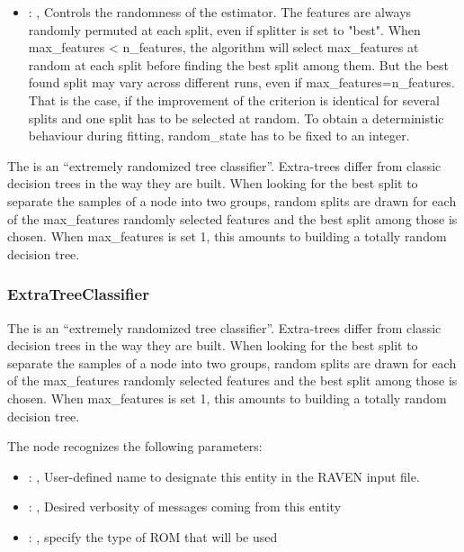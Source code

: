 \begin{itemize}
    \item {}: , 
      Controls the randomness of the estimator. The features are
      always randomly permuted at each split, even if splitter is set to
      "best". When max\_features < n\_features, the algorithm will select
      max\_features at random at each split before finding the best split
      among them. But the best found split may vary across different runs,
      even if max\_features=n\_features. That is the case, if the improvement
      of the criterion is identical for several splits and one split has to
      be selected at random. To obtain a deterministic behaviour during
      fitting, random\_state has to be fixed to an integer.
  \end{itemize}
 The  is an ``extremely randomized tree classifier''.
 Extra-trees differ from classic decision trees in the way they are built. When looking for the best
 split to separate the samples of a node into two groups, random splits are drawn for each of the
 max\_features randomly selected features and the best split among those is chosen. When
 max\_features                          is set 1, this amounts to building a totally random decision
 tree.                          

\subsubsection{ExtraTreeClassifier}
  The  is an ``extremely randomized tree classifier''.
  Extra-trees differ from classic decision trees in the way they are built. When looking for the
  best                          split to separate the samples of a node into two groups, random
  splits are drawn for each of the                          max\_features randomly selected features
  and the best split among those is chosen. When max\_features                          is set 1,
  this amounts to building a totally random decision tree.

  The  node recognizes the following parameters:
    \begin{itemize}
      \item {}: , 
        User-defined name to designate this entity in the RAVEN input file.
      \item {}: , 
        Desired verbosity of messages coming from this entity
      \item {}: , 
        specify the type of ROM that will be used
  \end{itemize}

